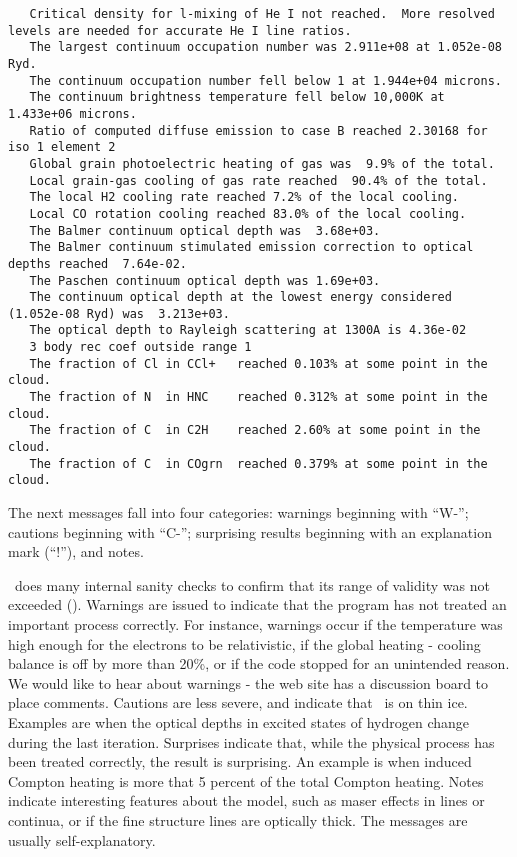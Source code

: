 {\begin{verbatim}
   Critical density for l-mixing of He I not reached.  More resolved levels are needed for accurate He I line ratios.
   The largest continuum occupation number was 2.911e+08 at 1.052e-08 Ryd.
   The continuum occupation number fell below 1 at 1.944e+04 microns.
   The continuum brightness temperature fell below 10,000K at 1.433e+06 microns.
   Ratio of computed diffuse emission to case B reached 2.30168 for iso 1 element 2
   Global grain photoelectric heating of gas was  9.9% of the total.
   Local grain-gas cooling of gas rate reached  90.4% of the total.
   The local H2 cooling rate reached 7.2% of the local cooling.
   Local CO rotation cooling reached 83.0% of the local cooling.
   The Balmer continuum optical depth was  3.68e+03.
   The Balmer continuum stimulated emission correction to optical depths reached  7.64e-02.
   The Paschen continuum optical depth was 1.69e+03.
   The continuum optical depth at the lowest energy considered (1.052e-08 Ryd) was  3.213e+03.
   The optical depth to Rayleigh scattering at 1300A is 4.36e-02
   3 body rec coef outside range 1
   The fraction of Cl in CCl+   reached 0.103% at some point in the cloud.
   The fraction of N  in HNC    reached 0.312% at some point in the cloud.
   The fraction of C  in C2H    reached 2.60% at some point in the cloud.
   The fraction of C  in COgrn  reached 0.379% at some point in the cloud.
\end{verbatim}
}

The next messages fall into four categories: warnings beginning with
``W-''; cautions beginning with ``C-''; surprising results beginning with an
explanation mark (``!''), and notes.

\Cloudy\ does many internal sanity checks to confirm that its range of
validity was not exceeded (\citealp{Ferland2001b}).
Warnings are issued to indicate
that the program has not treated an important process correctly.
For
instance, warnings occur if the temperature was high enough for the electrons
to be relativistic, if the global heating - cooling balance is off by more
than 20\%, or if the code stopped for an unintended reason.
We would like
to hear about warnings - the web site has a discussion board to place
comments.
Cautions are less severe, and indicate that \Cloudy\ is on thin
ice.
Examples are when the optical depths in excited states of hydrogen
change during the last iteration.
Surprises indicate
that, while the physical process has been treated correctly, the result
is surprising.
An example is when induced Compton heating is more that
5 percent of the total Compton heating.
Notes indicate interesting features
about the model, such as maser effects in lines or continua, or if the fine
structure lines are optically thick.
The messages are usually
self-explanatory.

